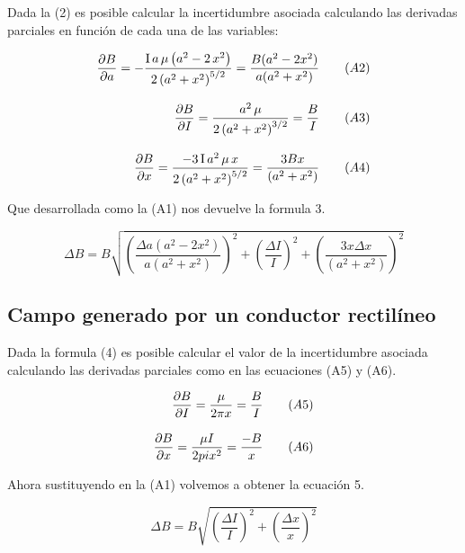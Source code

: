 \documentclass[article, 11pt]{report}
\newcommand{\dpartial}[2]{\frac{\partial #1 }{\partial #2}}
\begin{document}
Dada la (2) es posible calcular la incertidumbre asociada calculando las derivadas parciales en función de cada una de las variables:



\begin{equation*}
	\setlength{\jot}{12pt} %
	\begin{split}
		\dpartial{B}{a}= -\dfrac{\textrm{I}\,a\,\mu \,{\left(a^2 -2\,x^2 \right)}}{2\,{{\left(a^2 +x^2 \right)}}^{5/2} } = \dfrac{B (a^2 -2x^2)}{a(a^2+x^2)} ~~~~~~ (A2) \\
		\dpartial{B}{I} = \dfrac{a^2 \,\mu }{2\,{{\left(a^2 +x^2 \right)}}^{3/2} } = \dfrac{B}{I} ~~~~~~ (A3) \\
		 \dpartial{B}{x} = \dfrac{-3\,\textrm{I}\,a^2 \,\mu \,x}{2\,{{\left(a^2 +x^2 \right)}}^{5/2} } = \dfrac{3Bx}{(a^2+x^2)} ~~~~~~ (A4) \\
     	\end{split}
\end{equation*}


Que desarrollada como la (A1) nos devuelve la formula 3.

$$ \Delta B = B \sqrt{(\dfrac{\Delta a (a^2 -2x^2)}{a(a^2+x^2)})^2 + (\dfrac{\Delta I}{I})^2 +  (\dfrac{3x\Delta x }{(a^2 + x^2)})^2}   $$



\subsection*{Campo generado por un conductor rectilíneo}

Dada la formula (4) es posible calcular el valor de la incertidumbre asociada calculando las derivadas parciales como en las ecuaciones (A5) y (A6).

\begin{equation*}
	\setlength{\jot}{12pt} %
	\begin{split}
		\dpartial{B}{I} = \dfrac{\mu }{2 \pi x} =\dfrac{B}{I}  ~~~~~~ (A5) \\
		\dpartial{B}{x} =  \dfrac{\mu I }{2 pi x^2}=\dfrac{-B}{x} ~~~~~~ (A6) \\
	\end{split}
\end{equation*}

Ahora sustituyendo en la (A1) volvemos a obtener la ecuación 5.


$$\Delta B = B\sqrt{(\dfrac{\Delta I}{I})^2 + (\dfrac{\Delta x}{x})^2}$$
\end{document}
